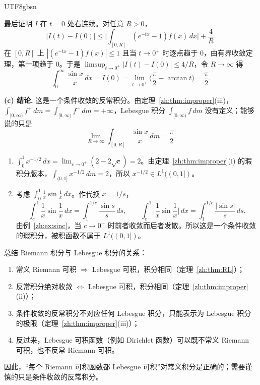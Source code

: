 \documentclass[11pt]{article}
\makeatletter
\newcommand{\envlabel}[1]{\protected@edef\@currentlabel{\themathenv}\label{#1}}
\makeatother
\begin{document}
\begin{CJK*}{UTF8}{gbsn}
\begin{example}
最后证明 $I$ 在 $t=0$ 处右连续。对任意 $R>0$，
\[
|I(t)-I(0)|\leq\Big|\int_{[0,R]}(e^{-tx}-1)f(x)\,dx\Big|+\frac4R.
\]
在 $[0,R]$ 上 $|(e^{-tx}-1)f(x)|\leq1$ 且当 $t\to0^{+}$ 时逐点趋于 $0$，由有界收敛定理，第一项趋于 $0$。于是 $\limsup_{t\to0^{+}}|I(t)-I(0)|\leq4/R$，令 $R\to\infty$ 得
\[
\int_{0}^{\infty}\frac{\sin x}{x}\,dx=I(0)=\lim_{t\to0^{+}}\Big(\frac\pi2-\arctan t\Big)=\frac{\pi}{2}.
\]

\textbf{(c) 结论.} 这是一个条件收敛的反常积分。由定理~\ref{zh:thm:improper}(iii)，$\int_{[0,\infty)}f^{+}\,dm=\int_{[0,\infty)}f^{-}\,dm=+\infty$，Lebesgue 积分 $\int_{[0,\infty)}f\,dm$ 没有定义；能够说的只是
\[
\lim_{R\to\infty}\int_{[0,R]}\frac{\sin x}{x}\,dm=\frac\pi2.
\]
\end{example}

\begin{example}[瑕积分]\envlabel{zh:ex:improper2}
\leavevmode
\begin{enumerate}
  \item $\int_{0}^{1}x^{-1/2}\,dx=\lim_{c\to0^{+}}(2-2\sqrt{c})=2$。由定理~\ref{zh:thm:improper}(i) 的瑕积分版本，$\int_{(0,1]}x^{-1/2}\,dm=2$，所以 $x^{-1/2}\in L^{1}((0,1])$。
  \item 考虑 $\int_{0}^{1}\frac1x\sin\frac1x\,dx$。作代换 $x=1/s$，
  \[
  \int_{c}^{1}\frac1x\sin\frac1x\,dx=\int_{1}^{1/c}\frac{\sin s}{s}\,ds,\qquad\int_{c}^{1}\Big|\frac1x\sin\frac1x\Big|\,dx=\int_{1}^{1/c}\frac{|\sin s|}{s}\,ds.
  \]
  由例~\ref{zh:ex:sinc}，当 $c\to0^{+}$ 时前者收敛而后者发散。所以这是一个条件收敛的瑕积分，被积函数不属于 $L^{1}((0,1])$。
\end{enumerate}
\end{example}

\begin{remark}
总结 Riemann 积分与 Lebesgue 积分的关系：
\begin{enumerate}
  \item 常义 Riemann 可积 $\Rightarrow$ Lebesgue 可积，积分相同（定理~\ref{zh:thm:RL}）；
  \item 反常积分绝对收敛 $\iff$ Lebesgue 可积，积分相同（定理~\ref{zh:thm:improper}(ii)）；
  \item 条件收敛的反常积分不对应任何 Lebesgue 积分，只能表示为 Lebesgue 积分的极限（定理~\ref{zh:thm:improper}(iii)）；
  \item 反过来，Lebesgue 可积函数（例如 Dirichlet 函数）可以既不常义 Riemann 可积，也不反常 Riemann 可积。
\end{enumerate}
因此，“每个 Riemann 可积函数都 Lebesgue 可积”对常义积分是正确的；需要谨慎的只是条件收敛的反常积分。
\end{remark}


\end{CJK*}
\end{document}
